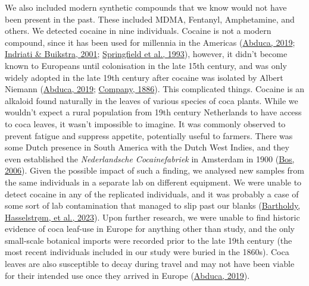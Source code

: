\documentclass[
  b5paper,
]{book}
\begin{document}
We also included modern synthetic compounds that we know would not have
been present in the past. These included MDMA, Fentanyl, Amphetamine,
and others. We detected cocaine in nine individuals. Cocaine is not a
modern compound, since it has been used for millennia in the Americas
(\protect\hyperlink{ref-abucaCocaTrade2019}{Abduca, 2019};
\protect\hyperlink{ref-indriatiCocaPrehistoric2001}{Indriati \&
Buikstra, 2001};
\protect\hyperlink{ref-springfieldCocaineMetabolites1993}{Springfield et
al., 1993}), however, it didn't become known to Europeans until
colonisation in the late 15th century, and was only widely adopted in
the late 19th century after cocaine was isolated by Albert Niemann
(\protect\hyperlink{ref-abucaCocaTrade2019}{Abduca, 2019};
\protect\hyperlink{ref-marianiCoca1886}{Company, 1886}). This
complicated things. Cocaine is an alkaloid found naturally in the leaves
of various species of coca plants. While we wouldn't expect a rural
population from 19th century Netherlands to have access to coca leaves,
it wasn't impossible to imagine. It was commonly observed to prevent
fatigue and suppress appetite, potentially useful to farmers. There was
some Dutch presence in South America with the Dutch West Indies, and
they even established the \emph{Nederlandsche Cocainefabriek} in
Amsterdam in 1900 (\protect\hyperlink{ref-bosHistoryLicit2006}{Bos,
2006}). Given the possible impact of such a finding, we analysed new
samples from the same individuals in a separate lab on different
equipment. We were unable to detect cocaine in any of the replicated
individuals, and it was probably a case of some sort of lab
contamination that managed to slip past our blanks
(\protect\hyperlink{ref-bartholdyMultiproxyAnalysis2023}{Bartholdy,
Hasselstrøm, et al., 2023}). Upon further research, we were unable to
find historic evidence of coca leaf-use in Europe for anything other
than study, and the only small-scale botanical imports were recorded
prior to the late 19th century (the most recent individuals included in
our study were buried in the 1860s). Coca leaves are also susceptible to
decay during travel and may not have been viable for their intended use
once they arrived in Europe
(\protect\hyperlink{ref-abucaCocaTrade2019}{Abduca, 2019}).
\end{document}
